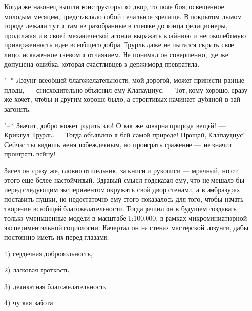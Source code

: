 Когда же наконец вышли конструкторы во двор, то поле боя,
освещенное молодым месяцем, представляло собой печальное
зрелище. В покрытом дымом городе лежали тут и там не
разобранные в спешке до конца фелиционеры, продолжая и в
своей механической агонии выражать крайнюю и непоколебимую
приверженность идее всеобщего добра. Трурль даже не пытался
скрыть свое лицо, искаженное гневом и отчаянием. Не понимал
он совершенно, где же допущена ошибка, которая счастливцев в
держиморд превратила.

"--* Лозунг всеобщей благожелательности, мой дорогой, может
принести разные плоды, --- снисходительно объяснил ему
Клапауциус. --- Тот, кому хорошо, сразу же хочет, чтобы и
другим хорошо было, а строптивых начинает дубиной в рай
загонять.

"--* Значит, добро может родить зло! О как же коварна
природа вещей! --- Крикнул Трурль. --- Тогда объявляю я бой
самой природе! Прощай, Клапауциус! Сейчас ты видишь меня
побежденным, но проиграть сражение --- не значит проиграть
войну!

Засел он сразу же, словно отшельник, за книги и рукописи --- мрачный,
но от этого еще более настойчивый. Здравый смысл
подсказал ему, что не мешало бы перед следующим
экспериментом окружить свой двор стенами, а в амбразурах
поставить пушки, но недостаточно ему этого показалось для
того, чтобы начать творение всеобщей благожелательности.
Тогда решил он в будущем создавать только уменьшенные модели
в масштабе 1:100.000, в рамках микроминиатюрной
экспериментальной социологии. Начертал он на стенах
мастерской лозунги, дабы постоянно иметь их перед глазами:

1) сердечная добровольность,

2) ласковая кроткость,

3) деликатная благожелательность

4) чуткая забота

